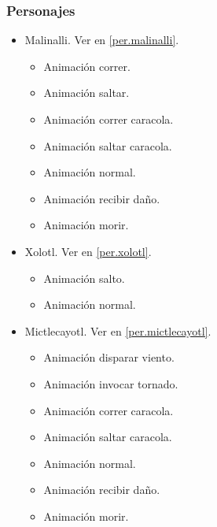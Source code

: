 \documentclass[11pt,letterpaper]{article}
\begin{document}
\begin{itemize}
        \subsubsection{Personajes}
        \begin{itemize}
                \item Malinalli. Ver en \ref{per.malinalli}.
                \begin{itemize}
                        \item Animación correr.
                        \item Animación saltar.
                        \item Animación correr caracola.
                        \item Animación saltar caracola.
                        \item Animación normal.
                        \item Animación recibir daño.
						\item Animación morir.
                \end{itemize} 
                \item Xolotl. Ver en \ref{per.xolotl}.
                \begin{itemize}
					\item Animación salto.
					\item Animación normal.
				\end{itemize}
                \item Mictlecayotl. Ver en \ref{per.mictlecayotl}.
                \begin{itemize}
                        \item Animación disparar viento.
                        \item Animación invocar tornado.
                        \item Animación correr caracola.
                        \item Animación saltar caracola.
                        \item Animación normal.
                        \item Animación recibir daño.
						\item Animación morir.
                \end{itemize} 
        \end{itemize}

\end{itemize}
\end{document}
